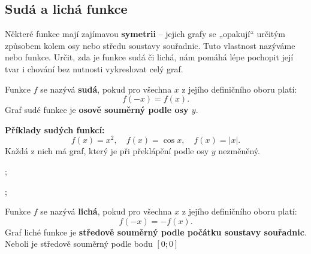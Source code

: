 \documentclass[12pt,a4paper]{article}
\begin{document}
\subsection*{Sudá a lichá funkce}

Některé funkce mají zajímavou \textbf{symetrii} – jejich grafy se „opakují“ určitým způsobem kolem osy nebo středu soustavy souřadnic.  
Tuto vlastnost nazýváme  nebo  funkce.  
Určit, zda je funkce sudá či lichá, nám pomáhá lépe pochopit její tvar i chování bez nutnosti vykreslovat celý graf.

\begin{definitionbox}

Funkce \(f\) se nazývá \textbf{sudá}, pokud pro všechna \(x\) z jejího definičního oboru platí:
\[
f(-x) = f(x).
\]
Graf sudé funkce je \textbf{osově souměrný podle osy \(y\)}.
\end{definitionbox}

\begin{examplebox}
\textbf{Příklady sudých funkcí:}
\[
f(x) = x^2, \quad f(x) = \cos x, \quad f(x) = |x|.
\]
Každá z nich má graf, který je při překlápění podle osy \(y\) nezměněný.
\begin{minipage}{0.45\textwidth}
    \begin{center}
        \begin{axisgraph}[grid=none, xmin=-3, xmax=3, ymin=-1, ymax=5, title={Sudá funkce: \(f(x)=x^2\)}]
            ;
        \end{axisgraph}
    \end{center}
    \end{minipage}
    \hfill
    \begin{minipage}{0.45\textwidth}
    \begin{center}
        \begin{axisgraph}[grid=none, xmin=-3, xmax=3, ymin=-3, ymax=3, title={Sudá funkce: \(f(x)=cos(x)\)}]
            ;
        \end{axisgraph}
    \end{center}
    \end{minipage}
\end{examplebox}

\bigskip
\begin{definitionbox}

Funkce \(f\) se nazývá \textbf{lichá}, pokud pro všechna \(x\) z jejího definičního oboru platí:
\[
f(-x) = -f(x).
\]
Graf liché funkce je \textbf{středově souměrný podle počátku soustavy souřadnic}. 
Neboli je středově souměrný podle bodu $[0;0]$
\end{definitionbox}
\end{document}
